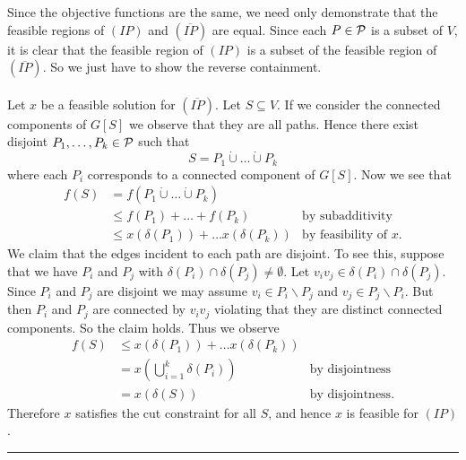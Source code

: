 \documentclass[letterpaper,12pt,oneside,onecolumn]{article}
\newenvironment{proof}{{\bf Proof:  }}{\hfill\rule{2mm}{2mm}}
\begin{document}
\begin{proof}
Since the objective functions are the same, we need only demonstrate that the feasible regions of $(IP)$ and $(\overline{IP})$ are equal. Since each $P \in \mathcal{P}$ is a subset of $V$, it is clear that the feasible region of $(IP)$ is a subset of the feasible region of $(\overline{IP})$. So we just have to show the reverse containment.
\paragraph{}
Let $x$ be a feasible solution for $(\overline{IP})$. Let $S \subseteq V$. If we consider the connected components of $G[S]$ we observe that they are all paths. Hence there exist disjoint $P_1, \dots, P_k \in \mathcal{P}$ such that
$$S = P_1 \dot\cup \dots \dot\cup P_k$$
where each $P_i$ corresponds to a connected component of $G[S]$. Now we see that
\begin{align*}
f(S) &= f(P_1 \dot\cup \dots \dot \cup P_k) \\
&\leq f(P_1) + \dots + f(P_k) &\text{by subadditivity} \\
&\leq x(\delta(P_1)) + \dots x(\delta(P_k)) &\text{by feasibility of $x$}.
\end{align*}
We claim that the edges incident to each path are disjoint. To see this, suppose that we have $P_i$ and $P_j$ with $\delta(P_i) \cap \delta(P_j) \neq \emptyset$. Let $v_iv_j \in \delta(P_i) \cap \delta(P_j)$. Since $P_i$ and $P_j$ are disjoint we may assume $v_i \in P_i \backslash P_j$ and $v_j \in P_j \backslash P_i$. But then $P_i$ and $P_j$ are connected by $v_iv_j$ violating that they are distinct connected components. So the claim holds. Thus we observe
\begin{align*}
f(S) &\leq x(\delta(P_1)) + \dots x(\delta(P_k)) \\
&= x(\bigcup_{i=1}^k \delta(P_i)) &\text{by disjointness}\\
&= x(\delta(S)) &\text{by disjointness}.
\end{align*}
Therefore $x$ satisfies the cut constraint for all $S$, and hence $x$ is feasible for $(IP)$.
\end{proof}
\end{document}
